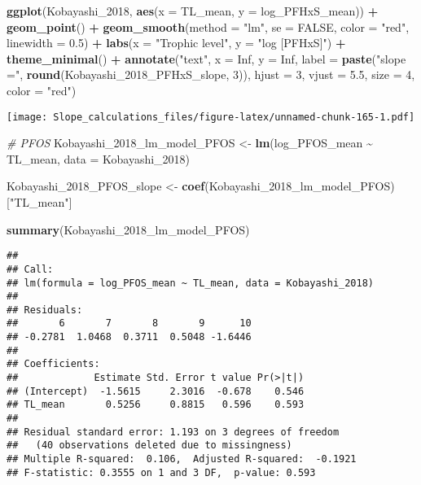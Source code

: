 \documentclass[
]{article}
\newenvironment{Shaded}{\begin{snugshade}}{\end{snugshade}}
\newcommand{\AttributeTok}[1]{\textcolor[rgb]{0.13,0.29,0.53}{#1}}
\newcommand{\CommentTok}[1]{\textcolor[rgb]{0.56,0.35,0.01}{\textit{#1}}}
\newcommand{\ConstantTok}[1]{\textcolor[rgb]{0.56,0.35,0.01}{#1}}
\newcommand{\DecValTok}[1]{\textcolor[rgb]{0.00,0.00,0.81}{#1}}
\newcommand{\FloatTok}[1]{\textcolor[rgb]{0.00,0.00,0.81}{#1}}
\newcommand{\FunctionTok}[1]{\textcolor[rgb]{0.13,0.29,0.53}{\textbf{#1}}}
\newcommand{\NormalTok}[1]{#1}
\newcommand{\OtherTok}[1]{\textcolor[rgb]{0.56,0.35,0.01}{#1}}
\newcommand{\SpecialCharTok}[1]{\textcolor[rgb]{0.81,0.36,0.00}{\textbf{#1}}}
\newcommand{\StringTok}[1]{\textcolor[rgb]{0.31,0.60,0.02}{#1}}
\begin{document}
\begin{Shaded}
\begin{Highlighting}[]
\FunctionTok{ggplot}\NormalTok{(Kobayashi\_2018, }\FunctionTok{aes}\NormalTok{(}\AttributeTok{x =}\NormalTok{ TL\_mean, }\AttributeTok{y =}\NormalTok{ log\_PFHxS\_mean)) }\SpecialCharTok{+}
  \FunctionTok{geom\_point}\NormalTok{() }\SpecialCharTok{+}
  \FunctionTok{geom\_smooth}\NormalTok{(}\AttributeTok{method =} \StringTok{"lm"}\NormalTok{, }\AttributeTok{se =} \ConstantTok{FALSE}\NormalTok{, }\AttributeTok{color =} \StringTok{"red"}\NormalTok{, }\AttributeTok{linewidth =} \FloatTok{0.5}\NormalTok{) }\SpecialCharTok{+}
  \FunctionTok{labs}\NormalTok{(}\AttributeTok{x =} \StringTok{"Trophic level"}\NormalTok{,}
       \AttributeTok{y =} \StringTok{"log [PFHxS]"}\NormalTok{) }\SpecialCharTok{+}
  \FunctionTok{theme\_minimal}\NormalTok{() }\SpecialCharTok{+}
  \FunctionTok{annotate}\NormalTok{(}\StringTok{"text"}\NormalTok{, }\AttributeTok{x =} \ConstantTok{Inf}\NormalTok{, }\AttributeTok{y =} \ConstantTok{Inf}\NormalTok{, }\AttributeTok{label =} \FunctionTok{paste}\NormalTok{(}\StringTok{"slope ="}\NormalTok{, }\FunctionTok{round}\NormalTok{(Kobayashi\_2018\_PFHxS\_slope, }\DecValTok{3}\NormalTok{)), }
           \AttributeTok{hjust =} \DecValTok{3}\NormalTok{, }\AttributeTok{vjust =} \FloatTok{5.5}\NormalTok{, }\AttributeTok{size =} \DecValTok{4}\NormalTok{, }\AttributeTok{color =} \StringTok{"red"}\NormalTok{)}
\end{Highlighting}
\end{Shaded}

\texttt{[image: Slope\_calculations\_files/figure-latex/unnamed-chunk-165-1.pdf]}

\begin{Shaded}
\begin{Highlighting}[]
\CommentTok{\# PFOS}
\NormalTok{Kobayashi\_2018\_lm\_model\_PFOS }\OtherTok{\textless{}{-}} \FunctionTok{lm}\NormalTok{(log\_PFOS\_mean }\SpecialCharTok{\textasciitilde{}}\NormalTok{ TL\_mean,}
                                    \AttributeTok{data =}\NormalTok{ Kobayashi\_2018)}

\NormalTok{Kobayashi\_2018\_PFOS\_slope }\OtherTok{\textless{}{-}} \FunctionTok{coef}\NormalTok{(Kobayashi\_2018\_lm\_model\_PFOS)[}\StringTok{"TL\_mean"}\NormalTok{]}

\FunctionTok{summary}\NormalTok{(Kobayashi\_2018\_lm\_model\_PFOS)}
\end{Highlighting}
\end{Shaded}

\begin{verbatim}
## 
## Call:
## lm(formula = log_PFOS_mean ~ TL_mean, data = Kobayashi_2018)
## 
## Residuals:
##       6       7       8       9      10 
## -0.2781  1.0468  0.3711  0.5048 -1.6446 
## 
## Coefficients:
##             Estimate Std. Error t value Pr(>|t|)
## (Intercept)  -1.5615     2.3016  -0.678    0.546
## TL_mean       0.5256     0.8815   0.596    0.593
## 
## Residual standard error: 1.193 on 3 degrees of freedom
##   (40 observations deleted due to missingness)
## Multiple R-squared:  0.106,  Adjusted R-squared:  -0.1921 
## F-statistic: 0.3555 on 1 and 3 DF,  p-value: 0.593
\end{verbatim}
\end{document}
